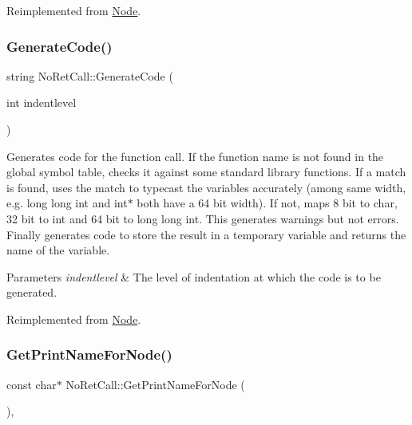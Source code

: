 Reimplemented from \hyperlink{class_node_a5f88d55c6f253a29def7ccc443d83d47}{Node}.

\mbox{\label{class_no_ret_call_aa22f4dafc2369254349a631034f498d0}} 
\subsubsection{\texorpdfstring{Generate\+Code()}{GenerateCode()}}
{\footnotesize\ttfamily string No\+Ret\+Call\+::\+Generate\+Code (\begin{DoxyParamCaption}\item[{int}]{indentlevel }\end{DoxyParamCaption})\hspace{0.3cm}{\ttfamily [virtual]}}

Generates code for the function call. If the function name is not found in the global symbol table, checks it against some standard library functions. If a match is found, uses the match to typecast the variables accurately (among same width, e.\+g. long long int and int$\ast$ both have a 64 bit width). If not, maps 8 bit to char, 32 bit to int and 64 bit to long long int. This generates warnings but not errors. Finally generates code to store the result in a temporary variable and returns the name of the variable. 
\begin{DoxyParams}{Parameters}
{\em indentlevel} & The level of indentation at which the code is to be generated. \\
\hline
\end{DoxyParams}


Reimplemented from \hyperlink{class_node_acb60e526730e8436056375a3055c2c32}{Node}.

\mbox{\label{class_no_ret_call_abfbfa06b9f232f16f1922f1c95b406d9}} 
\subsubsection{\texorpdfstring{Get\+Print\+Name\+For\+Node()}{GetPrintNameForNode()}}
{\footnotesize\ttfamily const char$\ast$ No\+Ret\+Call\+::\+Get\+Print\+Name\+For\+Node (\begin{DoxyParamCaption}{ }\end{DoxyParamCaption})\hspace{0.3cm}{\ttfamily [inline]}, {\ttfamily [virtual]}}

